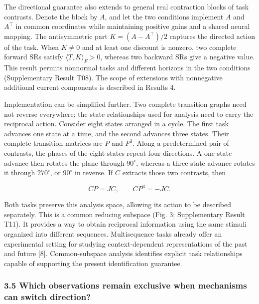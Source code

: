 \documentclass[11pt,a4paper]{article}
\begin{document}
The directional guarantee also extends to general real contraction
blocks of task contrasts. Denote the block by \(A\), and let the two
conditions implement \(A\) and \(A^\top\) in common coordinates while
maintaining positive gains and a shared neural mapping. The
antisymmetric part \(K=(A-A^\top)/2\) captures the directed action of
the task. When \(K\neq0\) and at least one discount is nonzero, two
complete forward SRs satisfy \(\langle T,K\rangle_F>0\), whereas two
backward SRs give a negative value. This result permits nonnormal tasks
and different horizons in the two conditions (Supplementary Result T08).
The scope of extensions with nonnegative additional current components
is described in Results 4.

\par
\noindent\begin{minipage}{\linewidth}

Implementation can be simplified further. Two complete transition graphs
need not reverse everywhere; the state relationships used for analysis
need to carry the reciprocal action. Consider eight states arranged in a
cycle. The first task advances one state at a time, and the second
advances three states. Their complete transition matrices are \(P\) and
\(P^3\). Along a predetermined pair of contrasts, the phases of the
eight states repeat four directions. A one-state advance then rotates
the plane through \(90^\circ\), whereas a three-state advance rotates it
through \(270^\circ\), or \(90^\circ\) in reverse. If \(C\) extracts
those two contrasts, then

\[
CP=JC,\qquad CP^3=-JC.
\]

\end{minipage}\par

Both tasks preserve this analysis space, allowing its action to be
described separately. This is a common reducing subspace (Fig. 3;
Supplementary Result T11). It provides a way to obtain reciprocal
information using the same stimuli organized into different sequences.
Multisequence tasks already offer an experimental setting for studying
context-dependent representations of the past and future {[}8{]}.
Common-subspace analysis identifies explicit task relationships capable
of supporting the present identification guarantee.

\subsubsection{3.5 Which observations remain exclusive when mechanisms
can switch
direction?}\label{which-observations-remain-exclusive-when-mechanisms-can-switch-direction}
\end{document}
